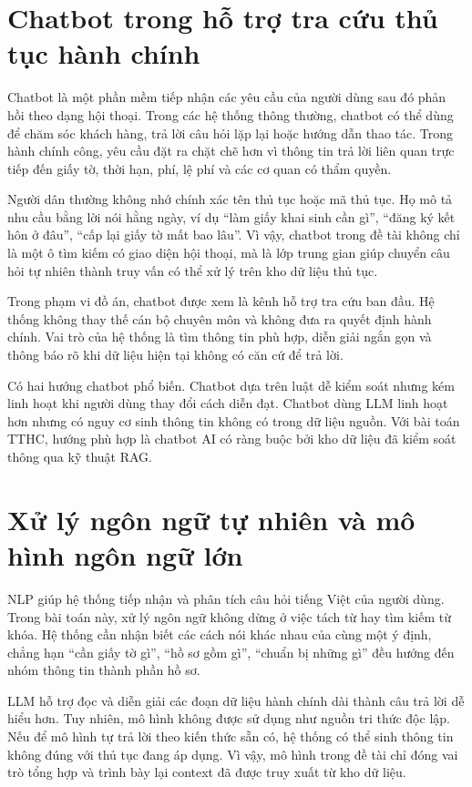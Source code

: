 \section{Chatbot trong hỗ trợ tra cứu thủ tục
hành
chính}

Chatbot là một phần mềm tiếp nhận các yêu cầu của người dùng sau đó phản
hồi theo dạng hội thoại. Trong các hệ thống thông thường, chatbot có thể
dùng để chăm sóc khách hàng, trả lời câu hỏi lặp lại hoặc hướng dẫn thao
tác. Trong hành chính công, yêu cầu đặt ra chặt chẽ hơn vì thông tin trả
lời liên quan trực tiếp đến giấy tờ, thời hạn, phí, lệ phí và các cơ
quan có thẩm quyền.

Người dân thường không nhớ chính xác tên thủ tục hoặc mã thủ tục. Họ mô
tả nhu cầu bằng lời nói hằng ngày, ví dụ ``làm giấy khai sinh cần gì'',
``đăng ký kết hôn ở đâu'', ``cấp lại giấy tờ mất bao lâu''. Vì vậy,
chatbot trong đề tài không chỉ là một ô tìm kiếm có giao diện hội thoại,
mà là lớp trung gian giúp chuyển câu hỏi tự nhiên thành truy vấn có thể
xử lý trên kho dữ liệu thủ tục.

Trong phạm vi đồ án, chatbot được xem là kênh hỗ trợ tra cứu ban đầu. Hệ
thống không thay thế cán bộ chuyên môn và không đưa ra quyết định hành
chính. Vai trò của hệ thống là tìm thông tin phù hợp, diễn giải ngắn gọn
và thông báo rõ khi dữ liệu hiện tại không có căn cứ để trả lời.

Có hai hướng chatbot phổ biến. Chatbot dựa trên luật dễ kiểm soát nhưng
kém linh hoạt khi người dùng thay đổi cách diễn đạt. Chatbot dùng LLM
linh hoạt hơn nhưng có nguy cơ sinh thông tin không có trong dữ liệu
nguồn. Với bài toán TTHC, hướng phù hợp là chatbot AI có ràng buộc bởi
kho dữ liệu đã kiểm soát thông qua kỹ thuật RAG.

\section{Xử lý ngôn ngữ tự nhiên và mô hình
ngôn ngữ
lớn}

NLP giúp hệ thống tiếp nhận và phân tích câu hỏi tiếng Việt của người
dùng. Trong bài toán này, xử lý ngôn ngữ không dừng ở việc tách từ hay
tìm kiếm từ khóa. Hệ thống cần nhận biết các cách nói khác nhau của cùng
một ý định, chẳng hạn ``cần giấy tờ gì'', ``hồ sơ gồm gì'', ``chuẩn bị
những gì'' đều hướng đến nhóm thông tin thành phần hồ sơ.

LLM hỗ trợ đọc và diễn giải các đoạn dữ liệu hành chính dài thành câu
trả lời dễ hiểu hơn. Tuy nhiên, mô hình không được sử dụng như nguồn tri
thức độc lập. Nếu để mô hình tự trả lời theo kiến thức sẵn có, hệ thống
có thể sinh thông tin không đúng với thủ tục đang áp dụng. Vì vậy, mô
hình trong đề tài chỉ đóng vai trò tổng hợp và trình bày lại context đã
được truy xuất từ kho dữ liệu.

